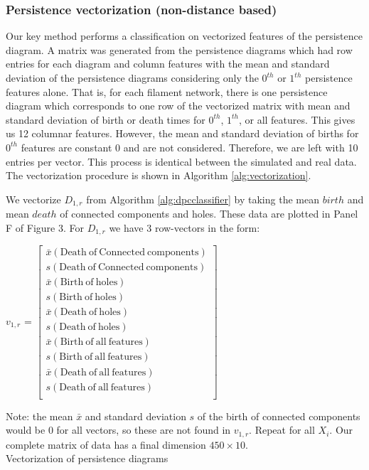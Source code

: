 \documentclass[10pt]{article}
\begin{document}
\subsubsection{Persistence vectorization (non-distance based)}
Our key method performs a classification on vectorized features of the persistence diagram. A matrix was generated from the persistence diagrams which had row entries for each diagram and column features with the mean and standard deviation of the persistence diagrams considering only the $0^{th}$ or $1^{th}$ persistence features alone. That is, for each filament network, there is one persistence diagram which corresponds to one row of the vectorized matrix with mean and standard deviation of birth or death times for $0^{th}$, $1^{th}$, or all features. This gives us 12 columnar features. However, the mean and standard deviation of births for $0^{th}$ features are constant 0 and are not considered. Therefore, we are left with 10 entries per vector. This process is identical between the simulated and real data. The vectorization procedure is shown in Algorithm \ref{alg:vectorization}. 

\begin{algorithm}[H]
	We vectorize $D_{1,r}$ from Algorithm \ref{alg:dpcclassifier} by taking the mean $birth$ and mean $death$ of connected components and holes. These data are plotted in Panel F of Figure 3. For $D_{1,r}$ we have 3 row-vectors in the form:
	\begin{center}
	    $v_{1,r}$ =
        $\begin{bmatrix}
            \bar{x}(\mathrm{Death~of~Connected~components})\\
            s(\mathrm{Death~of~Connected~components})\\
            \bar{x}(\mathrm{Birth~of~holes})\\
            s(\mathrm{Birth~of~holes})\\
            \bar{x}(\mathrm{Death~of~holes})\\
            s(\mathrm{Death~of~holes})\\
            \bar{x}(\mathrm{Birth~of~all~features})\\
            s(\mathrm{Birth~of~all~features})\\
            \bar{x}(\mathrm{Death~of~all~features})\\
            s(\mathrm{Death~of~all~features})\\
        \end{bmatrix}$
    \end{center}
	Note: the mean $\bar{x}$ and standard deviation $s$ of the birth of connected components would be $0$ for all vectors, so these are not found in $v_{1,r}$. Repeat for all $X_i$. Our complete matrix of data has a final dimension $450\times10$.\\
	\caption{Vectorization of persistence diagrams}
	\label{alg:vectorization}
\end{algorithm}
\end{document}
